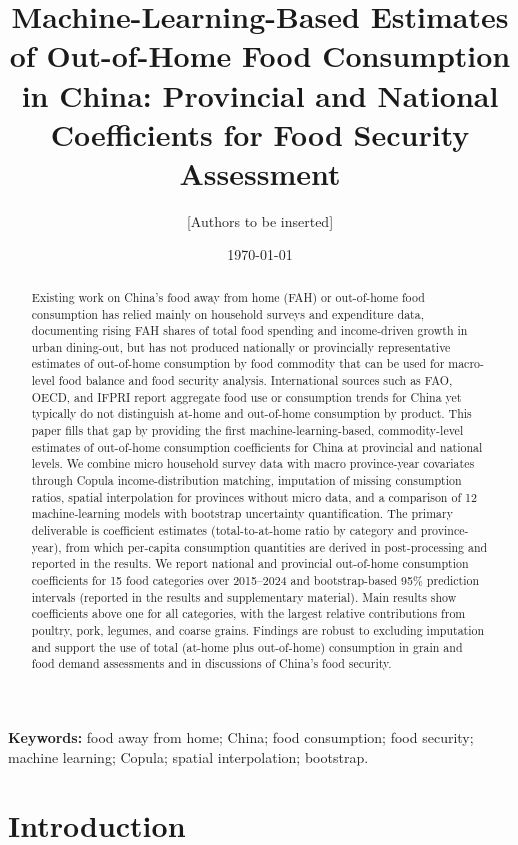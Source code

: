 \documentclass[12pt,a4paper]{article}
\title{Machine-Learning-Based Estimates of Out-of-Home Food Consumption in China: Provincial and National Coefficients for Food Security Assessment}
\author{[Authors to be inserted]}
\date{\today}
\begin{document}
\maketitle

\begin{abstract}
Existing work on China's food away from home (FAH) or out-of-home food consumption has relied mainly on household surveys and expenditure data, documenting rising FAH shares of total food spending and income-driven growth in urban dining-out, but has not produced nationally or provincially representative estimates of out-of-home consumption by food commodity that can be used for macro-level food balance and food security analysis. International sources such as FAO, OECD, and IFPRI report aggregate food use or consumption trends for China yet typically do not distinguish at-home and out-of-home consumption by product. This paper fills that gap by providing the first machine-learning-based, commodity-level estimates of out-of-home consumption coefficients for China at provincial and national levels. We combine micro household survey data with macro province-year covariates through Copula income-distribution matching, imputation of missing consumption ratios, spatial interpolation for provinces without micro data, and a comparison of 12 machine-learning models with bootstrap uncertainty quantification. The primary deliverable is coefficient estimates (total-to-at-home ratio by category and province-year), from which per-capita consumption quantities are derived in post-processing and reported in the results. We report national and provincial out-of-home consumption coefficients for 15 food categories over 2015--2024 and bootstrap-based 95\% prediction intervals (reported in the results and supplementary material). Main results show coefficients above one for all categories, with the largest relative contributions from poultry, pork, legumes, and coarse grains. Findings are robust to excluding imputation and support the use of total (at-home plus out-of-home) consumption in grain and food demand assessments and in discussions of China's food security.
\end{abstract}

\noindent\textbf{Keywords:} food away from home; China; food consumption; food security; machine learning; Copula; spatial interpolation; bootstrap.

\section{Introduction}
\label{sec:introduction}
\end{document}
